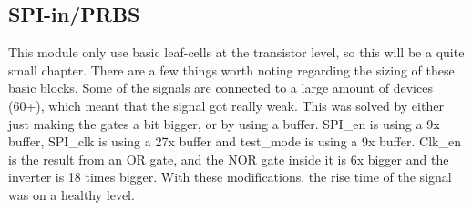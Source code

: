 
\subsection{SPI-in/PRBS}
This module only use basic leaf-cells at the transistor level, so this will be a quite small chapter. There are a few things worth noting regarding the sizing of these basic blocks. Some of the signals are connected to a large amount of devices (60+), which meant that the signal got really weak. This was solved by either just making the gates a bit bigger, or by using a buffer. SPI\_en is using a 9x buffer, SPI\_clk is using a 27x buffer and test\_mode is using a 9x buffer. Clk\_en is the result from an OR gate, and the NOR gate inside it is 6x bigger and the inverter is 18 times bigger. With these modifications, the rise time of the signal was on a healthy level.

